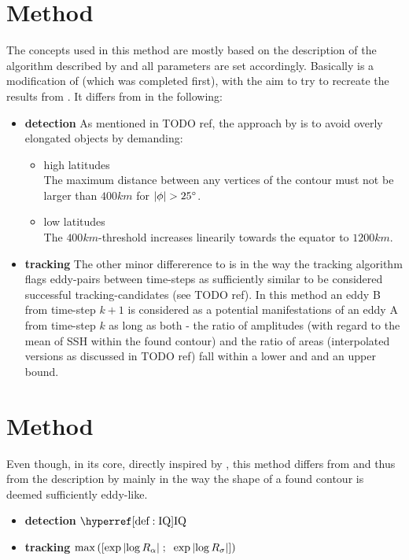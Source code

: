 \section{Method \MI}
The concepts used in this method are mostly based on the description of the algorithm described by \citep{Chelton2011} and all parameters are set accordingly. Basically \MI is a modification of \MII (which was completed first), with the aim to try to recreate the results from \citep{Chelton2011}.
It differs from \MII in the following:
\begin{itemize}
	\item \textbf{detection}
As mentioned in TODO ref, the approach by \citet{Chelton2011} is to avoid overly elongated objects by demanding:
\begin{itemize}
	\item high latitudes\\
	The maximum distance between any vertices of the contour must not be larger than $400km$ for $\abs{\phi}>\deg{25}$.
	\item low latitudes\\
The $400km$-threshold increases linearily towards the equator to $1200km$.
\end{itemize}
	\item \textbf{tracking}
The other minor differerence to \MII is in the way the tracking algorithm flags eddy-pairs between time-steps as sufficiently similar to be considered successful tracking-candidates (see TODO ref).
In this method an eddy B from time-step $k+1$ is considered as a potential manifestations of an eddy A from time-step $k$ as long as both - the ratio of amplitudes (with regard to the mean of SSH within the found contour) and the ratio of areas (interpolated versions as discussed in TODO ref) fall within a lower and and an upper bound.
\end{itemize}


\section{Method \MII}
Even though, in its core, directly inspired by \citep{Chelton2011}, this method differs from \MII and thus from the description by \citeauthor{Chelton2011} mainly in the way the shape of a found contour is deemed sufficiently eddy-like.
\begin{itemize}
	\item \textbf{detection}
$\IQ$
	\item \textbf{tracking}
$\max{\left(\left[\exp{\left|\log{R_{\alpha}}\right|}\; ; \;\; \exp{\left|\log{R_{\sigma}}\right|} \right]\right)} $
\end{itemize}
